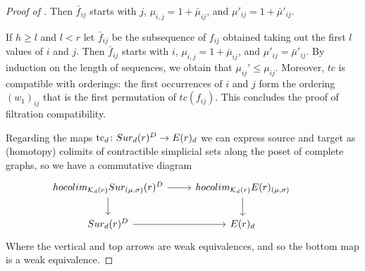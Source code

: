 \begin{proof}[Proof of ]
	Then $\bar{f}_{ij}$ starts with $j$, $\mu_{i,j}=1+\bar{\mu}_{ij}$, and $\mu'_{ij}=1+\bar{\mu}'_{ij}$.

	If $h \geq l$ and $l<r$ let $\bar{f}_{ij}$ be the subsequence of $f_{ij}$ obtained taking out the first $l$ values of $i$ and $j$.
	Then $\bar{f}_{ij}$	starts with $i$, $\mu_{i,j}=1+\bar{\mu}_{ij}$, and $\mu'_{ij}=\bar{\mu}'_{ij}$.
	By induction on the length of sequences, we obtain that $\mu_{ij}'\le \mu_{ij}$.
	Moreover, $tc$ is compatible with orderings: the first occurrences of $i$ and $j$ form the ordering $(w_1)_{ij}$ that is the first permutation of $tc(f_{ij})$.
	This concludes the proof of filtration compatibility.

	Regarding the maps $\operatorname{tc}_{d} \colon Sur_{d}(r)^{D}\rightarrow E(r)_{d}$ we can express source and target as (homotopy) colimits of contractible simplicial sets along the poset of complete graphs,
	so we have a commutative diagram
	\begin{equation*}
		\begin{tikzcd}
			hocolim_{\CG_d(r)}\sur_{(\mu,\sigma)}(r)^{D} \arrow[r] \arrow[d]&
			hocolim_{\CG_d(r)}\BE(r)_{(\mu,\sigma)} \arrow[d] \\
			\sur_{d}(r)^{D}\arrow[r] & \BE(r)_{d}&
		\end{tikzcd}
	\end{equation*}
	Where the vertical and top arrows
	are weak equivalences, and so the bottom map is a weak equivalence.
\end{proof}